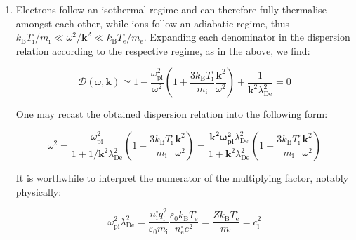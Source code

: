 \begin{enumerate}
    \begin{equation}
        \mathcal{D}(\omega,\mathbf{k})\simeq1+\frac{1}{\mathbf{k}^2\lambda_\text{Di}^2}+\frac{1}{\mathbf{k}^2\lambda_\text{De}^2}=1+\frac{1}{\mathbf{k}^2\lambda_\mathrm{d}^2}=0
    \end{equation}

    The obtained dispersion relation is independent of the phenomenon frequency, and solving for $\mathbf{k}$ gives imaginary solutions. This corresponds to Debye shielding of the phenomenon and is merely expected, since such phenomena allow the plasma to thermalise fully.

    \item Electrons follow an isothermal regime and can therefore fully thermalise amongst each other, while ions follow an adiabatic regime, thus $k_\mathrm{B}T_\mathrm{i}^\square/m_\mathrm{i}\ll\omega^2/\mathbf{k}^2\ll k_\mathrm{B}T_\text{e}^\square/m_\text{e}$. Expanding each denominator in the dispersion relation according to the respective regime, as in the above, we find:

    \begin{equation}
        \mathcal{D}(\omega,\mathbf{k})\simeq1-\frac{\omega_\text{pi}^2}{\omega^2}\left(1+\frac{3k_\mathrm{B}T_\mathrm{i}^\square}{m_\mathrm{i}}\frac{\mathbf{k}^2}{\omega^2}\right)+\frac{1}{\mathbf{k}^2\lambda_\text{De}^2}=0
    \end{equation}

    One may recast the obtained dispersion relation into the following form:

    \begin{equation}
        \omega^2=\frac{\omega_\text{pi}^2}{1+1/\mathbf{k}^2\lambda_\text{De}^2}\left(1+\frac{3k_\mathrm{B}T_\mathrm{i}^\square}{m_\mathrm{i}}\frac{\mathbf{k}^2}{\omega^2}\right)=\frac{\mathbf{k^2\omega_\text{pi}^2}\lambda_\text{De}^2}{1+\mathbf{k}^2\lambda_{\text{De}}^2}\left(1+\frac{3k_\mathrm{B}T_\mathrm{i}^\square}{m_\mathrm{i}}\frac{\mathbf{k}^2}{\omega^2}\right)
    \end{equation}

    It is worthwhile to interpret the numerator of the multiplying factor, notably physically:

    \begin{equation}
        \omega_\text{pi}^2\lambda_\text{De}^2=\frac{n_\mathrm{i}^\square q_\mathrm{i}^2}{\varepsilon_0 m_\mathrm{i}}\frac{\varepsilon_0k_\mathrm{B}T_\text{e}^\square}{n_\text{e}^\square e^2}=\frac{Zk_\mathrm{B}T_\text{e}^\square}{m_\mathrm{i}}=c_\mathrm{i}^2
    \end{equation}


\end{enumerate}

